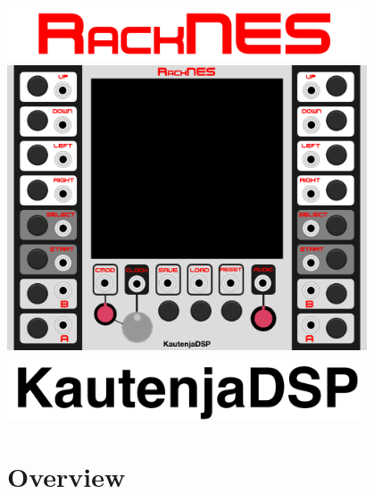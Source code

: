 \documentclass[12pt,a4paper]{article}
\begin{document}

\thispagestyle{empty}
\vspace*{\fill}
\begin{center}
\includegraphics[width=0.8\textwidth]{RackNES-Logo}
\linebreak\linebreak\linebreak\linebreak
\includegraphics[width=0.8\textwidth]{RackNES-Module}
\linebreak\linebreak\linebreak\linebreak
\includegraphics[width=0.8\textwidth]{KautenjaDSP}
\end{center}
\vspace*{\fill}
\clearpage


\section{Overview}
\end{document}
